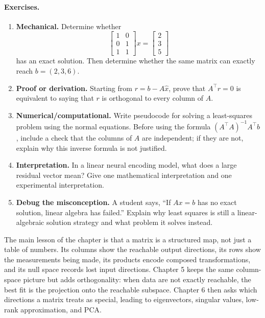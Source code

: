 \paragraph{Exercises.}
\begin{enumerate}[label=\textbf{4.4.\arabic*.}, leftmargin=*]
\item \textbf{Mechanical.} Determine whether
\[
\begin{bmatrix}
1&0\\
0&1\\
1&1
\end{bmatrix}
x
=
\begin{bmatrix}
2\\3\\5
\end{bmatrix}
\]
has an exact solution. Then determine whether the same matrix can exactly reach \(b=(2,3,6)\).
\item \textbf{Proof or derivation.} Starting from \(r=b-A\hat x\), prove that \(A^\top r=0\) is equivalent to saying that \(r\) is orthogonal to every column of \(A\).
\item \textbf{Numerical/computational.} Write pseudocode for solving a least-squares problem using the normal equations. Before using the formula \((A^\top A)^{-1}A^\top b\), include a check that the columns of \(A\) are independent; if they are not, explain why this inverse formula is not justified.
\item \textbf{Interpretation.} In a linear neural encoding model, what does a large residual vector mean? Give one mathematical interpretation and one experimental interpretation.
\item \textbf{Debug the misconception.} A student says, ``If \(Ax=b\) has no exact solution, linear algebra has failed.'' Explain why least squares is still a linear-algebraic solution strategy and what problem it solves instead.
\end{enumerate}

The main lesson of the chapter is that a matrix is a structured map, not just a table of numbers. Its columns show the reachable output directions, its rows show the measurements being made, its products encode composed transformations, and its null space records lost input directions. Chapter 5 keeps the same column-space picture but adds orthogonality: when data are not exactly reachable, the best fit is the projection onto the reachable subspace. Chapter 6 then asks which directions a matrix treats as special, leading to eigenvectors, singular values, low-rank approximation, and PCA.

\clearpage
